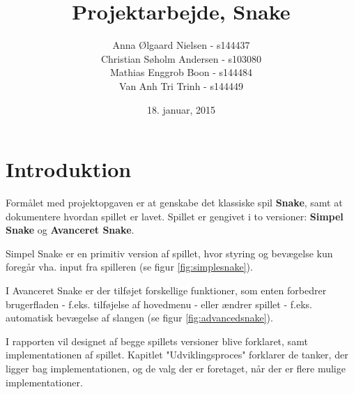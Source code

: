 \documentclass{report}
\begin{document}
\title{Projektarbejde, Snake}
\date{18. januar, 2015}
\author{	Anna Ølgaard Nielsen - 			s144437\\
Christian Søholm Andersen 	- s103080\\
Mathias Enggrob Boon - 			s144484\\
Van Anh Tri Trinh - 				s144449}

\maketitle
\tableofcontents
\newpage
\setcounter{chapter}{0}
\chapter{Introduktion}
Formålet med projektopgaven er at genskabe det klassiske spil \textbf{Snake}, samt at dokumentere hvordan spillet er lavet.
Spillet er gengivet i to versioner: \textbf{Simpel Snake} og \textbf{Avanceret Snake}. 

Simpel Snake er en primitiv version af spillet, hvor styring og bevægelse kun foregår vha. input fra spilleren (se figur \ref{fig:simplesnake}). 

I Avanceret Snake er der tilføjet forskellige funktioner, som enten forbedrer brugerfladen - f.eks. tilføjelse af hovedmenu - eller ændrer spillet - f.eks. automatisk bevægelse af slangen (se figur \ref{fig:advancedsnake}).

I rapporten vil designet af begge spillets versioner blive forklaret, samt implementationen af spillet. Kapitlet "Udviklingsproces" forklarer de tanker, der ligger bag implementationen, og de valg der er foretaget, når der er flere mulige implementationer.

\begin{figure}[b]
	\centering
	\graphicspath{ {pics/} }
	\hspace{0.1\textwidth}
	\caption{}
\end{figure}
\end{document}
